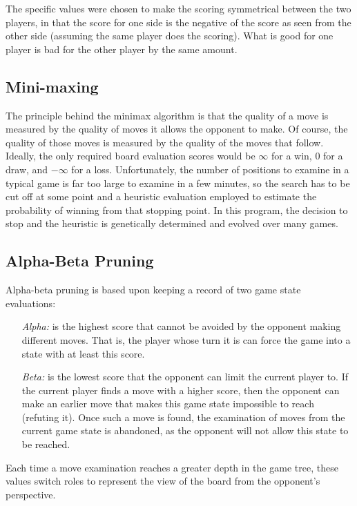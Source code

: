 \documentclass[letter]{article}
\renewcommand\_{\textunderscore\allowbreak}
\begin{document}
The specific values were chosen to make the scoring symmetrical between the two players, in that the score for one side is the negative of the score as seen from the other side (assuming the same player does the scoring). What is good for one player is bad for the other player by the same amount.

\subsection{Mini-maxing}

The principle behind the minimax algorithm is that the quality of a move is measured by the quality of moves it allows the opponent to make. Of course, the quality of those moves is measured by the quality of the moves that follow. Ideally, the only required board evaluation scores would be $\infty$ for a win, 0 for a draw, and $-\infty$ for a loss. Unfortunately, the number of positions to examine in a typical game is far too large to examine in a few minutes, so the search has to be cut off at some point and a heuristic evaluation employed to estimate the probability of winning from that stopping point. In this program, the decision to stop and the heuristic is genetically determined and evolved over many games.

\subsection{Alpha-Beta Pruning}

Alpha-beta pruning is based upon keeping a record of two game state evaluations:
\begin{itemize}
	\item[\em{Alpha}:] is the highest score that cannot be avoided by the opponent making different moves. That is, the player whose turn it is can force the game into a state with at least this score.
	\item[\em{Beta}:] is the lowest score that the opponent can limit the current player to. If the current player finds a move with a higher score, then the opponent can make an earlier move that makes this game state impossible to reach (refuting it). Once such a move is found, the examination of moves from the current game state is abandoned, as the opponent will not allow this state to be reached.
\end{itemize}
Each time a move examination reaches a greater depth in the game tree, these values switch roles to represent the view of the board from the opponent's perspective.
\end{document}
